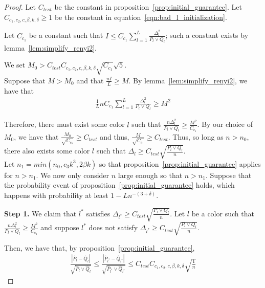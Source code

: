 \documentclass{article}
\begin{document}
\begin{proof}

Let $C_{test}$ be the constant in proposition~\ref{prop:initial_guarantee}. Let $C_{c_1, c_2, c, \beta, k, \delta} \geq 1$ be the constant in equation~\ref{eqn:bad_l_initialization}.

Let $C_{c_1}$ be a constant such that $I \leq C_{c_1} \sum_{l=1}^L \frac{\Delta_l^2}{P_l \vee Q_l}$; such a constant exists by lemma~\ref{lem:simplify_renyi2}. 

We set $M_0 > C_{test} C_{c_1, c_2, c, \beta, k, \delta} \sqrt{C_{c_1}} \sqrt{5}$. \\

Suppose that $M > M_0$ and that $\frac{n I}{L} \geq M$. By lemma~\ref{lem:simplify_renyi2}, we have that
\begin{align*}
\frac{1}{L} n C_{c_1} \sum_{l=1}^L \frac{\Delta_l^2}{P_l \vee Q_l} \geq M^2
\end{align*}

Therefore, there must exist some color $l$ such that $\frac{n \Delta_l^2}{P_l \vee Q_l} \geq \frac{M^2}{C_{c_1}}$. By our choice of $M_0$, we have that $\frac{M_0}{\sqrt{C_{c_1}}} \geq C_{test}$ and thus, $\frac{M}{\sqrt{C_{c_1}}} \geq C_{test}$. Thus, so long as $n > n_0$, there also exists some color $l$ such that $\Delta_l \geq C_{test} \sqrt{\frac{P_l \vee Q_l}{n}}$. \\


Let $n_1 = min(n_0, c_3 k^3, 2 \beta k)$ so that proposition~\ref{prop:initial_guarantee} applies for $n > n_1$. We now only consider $n$ large enough so that $n > n_1$.
Suppose that the probability event of proposition~\ref{prop:initial_guarantee} holds, which happens with probability at least $1 - L n^{-(3+\delta)}$. 

\textbf{Step 1.} We claim that $l^*$ satisfies $\Delta_{l^*} \geq C_{test} \sqrt{ \frac{P_l \vee Q_l}{n}} $. Let $l$ be a color such that $\frac{n \Delta_l^2}{P_l \vee Q_l} \geq \frac{M^2}{C_{c_1}}$ and suppose $l^*$ does not satisfy $\Delta_{l^*} \geq C_{test} \sqrt{ \frac{P_l \vee Q_l}{n} }$. 

Then, we have that, by proposition~\ref{prop:initial_guarantee}, 
\begin{align*}
\frac{| \hat{P}_l - \hat{Q}_l | }{\sqrt{ \hat{P}_l \vee \hat{Q}_l}} 
  \leq \frac{| \hat{P}_{l^*} - \hat{Q}_{l^*} | }{\sqrt{ \hat{P}_{l^*} \vee \hat{Q}_{l^*}}} 
         \leq C_{test} C_{c_1, c_2, c, \beta, k, \delta} \sqrt{ \frac{1}{n}} 
\end{align*}


\end{proof}
\end{document}
